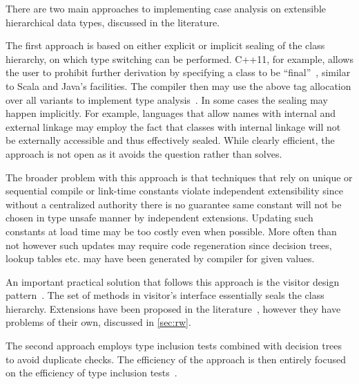 \noindent
There are two main approaches to implementing case analysis on extensible 
hierarchical data types, discussed in the literature.

The first approach is based on either explicit or implicit sealing of the class 
hierarchy, on which type switching can be performed. C++11, for example, allows 
the user to prohibit further derivation by specifying a class to be ``final''~\cite{C++11}, 
similar to Scala and Java's facilities. The compiler then may use the above tag 
allocation over all variants to implement type analysis~\cite[.2]{EmirThesis}. 
In some cases the sealing may happen implicitly. For example, languages that 
allow names with internal and external linkage may employ the fact that classes 
with internal linkage will not be externally accessible and thus effectively 
sealed. While clearly efficient, the approach is not open as it avoids the 
question rather than solves. 

The broader problem with this approach is that techniques that rely on unique or
sequential compile or link-time constants violate independent extensibility 
since without a centralized authority there is no guarantee same constant will 
not be chosen in type unsafe manner by independent extensions. Updating such 
constants at load time may be too costly even when possible. More often than 
not however such updates may require code regeneration since decision trees, 
lookup tables etc. may have been generated by compiler for given values.

An important practical solution that follows this approach is the visitor design 
pattern~\cite{DesignPatterns1993}. The set of  methods in visitor's 
interface essentially seals the class hierarchy. Extensions have been proposed 
in the literature~\cite{Zenger:2001}, however they have problems of their own, 
discussed in \textsection\ref{sec:rw}.

The second approach employs type inclusion tests combined with decision 
trees~\cite{Cardelli84} to avoid duplicate checks. The efficiency of the 
approach is then entirely focused on the efficiency of type inclusion 
tests~\cite{Schubert83,Wirth88,Cohen91,Caseau93,Vortex96,Krall97nearoptimal,Vitek97,PQEncoding,FastDynCast,Ducournau08}.



